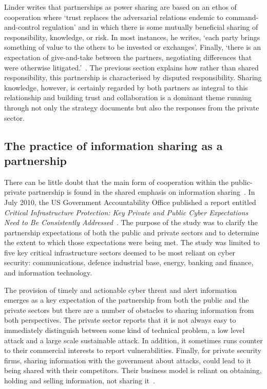 \documentclass[a4paper,11pt]{article}
\begin{document}
Linder writes that partnerships as power sharing are based on an ethos
of cooperation where `trust replaces the adversarial relations endemic
to command-and-control regulation' and in which there is some mutually
beneficial sharing of responsibility, knowledge, or risk. In most
instances, he writes, `each party brings something of value to the
others to be invested or exchanges'. Finally, `there is an expectation
of give-and-take between the partners, negotiating differences that
were otherwise litigated.'~\cite{linder:1999}.  The previous section
explains how rather than shared responsibility, this partnership is
characterised by disputed responsibility. Sharing knowledge, however,
is certainly regarded by both partners as integral to this
relationship and building trust and collaboration is a dominant theme
running through not only the strategy documents but also the responses
from the private sector.

\subsection{The practice of information sharing as a partnership}

There can be little doubt that the main form of cooperation within the
public-private partnership is found in the shared emphasis on
information sharing~\cite{dunncavelty+suter:2009}. In July 2010, the
US Government Accountability Office published a report entitled
{\emph{Critical Infrastructure Protection: Key Private and Public
Cyber Expectations Need to Be Consistently
Addressed}}~\cite{usgao:2010}. The purpose of the study was to clarify
the partnership expectations of both the public and private sectors
and to determine the extent to which those expectations were being
met. The study was limited to five key critical infrastructure sectors
deemed to be most reliant on cyber security: communications, defence
industrial base, energy, banking and finance, and information
technology.

The provision of timely and actionable cyber threat and alert
information emerges as a key expectation of the partnership from both
the public and the private sectors but there are a number of obstacles
to sharing information from both perspectives.  The private sector
reports that it is not always easy to immediately distinguish between
some kind of technical problem, a low level attack and a large scale
sustainable attack.  In addition, it sometimes runs counter to their
commercial interests to report vulnerabilities. Finally, for private
security firms, sharing information with the government about attacks,
could lead to it being shared with their competitors. Their business
model is reliant on obtaining, holding and selling information, not
sharing it~\cite{usgao:2010}.
\end{document}
